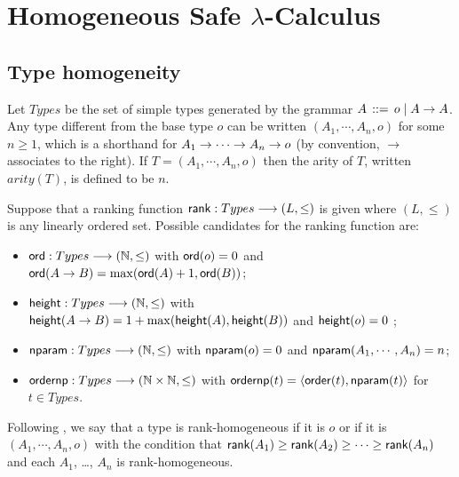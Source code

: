 \section{Homogeneous Safe $\lambda$-Calculus}
\label{sec:safe_homog}

\subsection{Type homogeneity}
Let $Types$ be the set of simple types generated by the grammar $A
\, ::= \, o \; | \; A \rightarrow A$. Any type different from the base
type $o$ can be written $(A_1, \cdots, A_n, o)$ for some $n \geq 1$,
which is a shorthand for $A_1 \rightarrow \cdots \rightarrow A_n \rightarrow o$ (by
convention, $\rightarrow$ associates to the right). If $T=(A_1,
\cdots, A_n, o)$ then the arity of $T$, written $arity(T)$, is
defined to be $n$.

Suppose that a ranking function ${\sf rank} :
Types \longrightarrow (L, \leq)$ is given where $(L, \leq)$ is any linearly ordered
set. Possible candidates for the ranking function are:
\begin{itemize}
\item ${\sf ord} : Types \longrightarrow (\mathbb{N},\leq)$ with ${\sf ord}(o) = 0$
and ${\sf ord}(A \rightarrow B) = \max({\sf ord}(A)+1, {\sf ord}(B))$;
\item ${\sf height} : Types \longrightarrow (\mathbb{N},\leq)$ with
${\sf height}(A \rightarrow B) = 1 + \max({\sf height}(A), {\sf height}(B))$ and
${\sf height}(o) = 0$ ;
\item ${\sf nparam} : Types \longrightarrow (\mathbb{N},\leq)$ with ${\sf nparam}(o) = 0$
and ${\sf nparam}(A_1, \cdots, A_n) = n$;
\item ${\sf ordernp} : Types \longrightarrow (\mathbb{N} \times \mathbb{N},\leq)$ with $ {\sf ordernp} (t)  = \langle {\sf order}(t), {\sf nparam}(t) \rangle$ for $t \in Types$.
\end{itemize}
Following \cite{KNU02}, we say that a type is {\sf rank}-homogeneous
if it is $o$ or if it is $(A_1, \cdots, A_n, o)$ with the condition
that ${\sf rank}(A_1) \geq {\sf rank}(A_2)\geq \cdots \geq {\sf rank}(A_n)$ and
each $A_1$, \ldots, $A_n$ is {\sf rank}-homogeneous.



